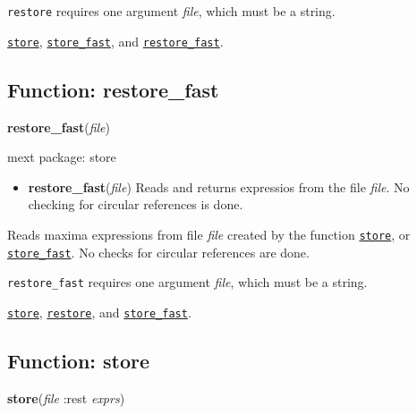 \documentclass[]{article}
\begin{document}
\vspace{5 pt}

   {\tt restore} requires one argument {\it file}, which must be a string.


\vspace{5 pt}


  \hyperlink{store}{{\tt store}}, \hyperlink{store_fast}{{\tt store\_fast}}, and \hyperlink{restore_fast}{{\tt restore\_fast}}.

\vspace{5 pt}


\subsection{Function: restore\_fast\label{sec:restore_fast}}
\hypertarget{restore_fast}{}
{\bf restore\_fast}({\it file})


\noindent mext package: store



\vspace{5 pt}
\begin{itemize}
\item[] {\bf restore\_fast}({\it file})
  Reads and returns expressios from the file {\it file}. No checking for circular references is done. 

\end{itemize}
Reads maxima expressions from file {\it file} created by the function \hyperlink{store}{{\tt store}}, or \hyperlink{store_fast}{{\tt store\_fast}}. No checks for circular references are done. 

\vspace{5 pt}

   {\tt restore\_fast} requires one argument {\it file}, which must be a string.


\vspace{5 pt}


  \hyperlink{store}{{\tt store}}, \hyperlink{restore}{{\tt restore}}, and \hyperlink{store_fast}{{\tt store\_fast}}.

\vspace{5 pt}


\subsection{Function: store\label{sec:store}}
\hypertarget{store}{}
{\bf store}({\it file} :rest {\it exprs})
\end{document}
